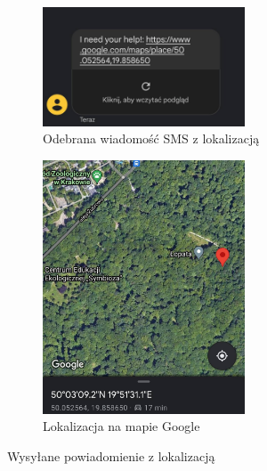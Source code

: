 \begin{figure}
    \centering
    \begin{subfigure}[b]{6cm}
    \includegraphics[width=6cm]{Graphics/sms.jpg}
    \caption{Odebrana wiadomość SMS z lokalizacją}
    \label{img:sms}
    \end{subfigure}%
    \vspace{1cm}
    \begin{subfigure}[b]{6cm}
    \includegraphics[width=6cm]{Graphics/maps.jpg}
    \caption{Lokalizacja na mapie Google}
    \label{img:maps}
    \end{subfigure}
    \caption{Wysyłane powiadomienie z lokalizacją}
    \label{img:notification}
\end{figure}